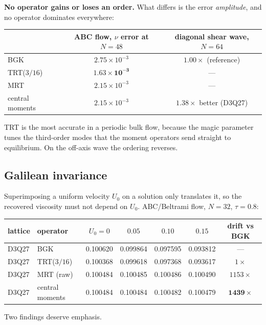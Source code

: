 \documentclass[11pt,a4paper]{article}
\begin{document}
\noindent \textbf{No operator gains or loses an order.} What differs is the error
\emph{amplitude}, and no operator dominates everywhere:

\begin{center}\small
\begin{tabular}{lcc}
\toprule
 & ABC flow, $\nu$ error at $N=48$ & diagonal shear wave, $N=64$ \\
\midrule
BGK & $2.75\times10^{-3}$ & $1.00\times$ (reference) \\
TRT($3/16$) & $\bm{1.63\times10^{-3}}$ & --- \\
MRT & $2.15\times10^{-3}$ & --- \\
central moments & $2.15\times10^{-3}$ & $\bm{1.38\times}$ better (D3Q27) \\
\bottomrule
\end{tabular}
\end{center}

\noindent TRT is the most accurate in a periodic bulk flow, because the magic
parameter tunes the third-order modes that the moment operators send straight to
equilibrium. On the off-axis wave the ordering reverses.

\subsection{Galilean invariance}
\label{sec:galilean}

Superimposing a uniform velocity $U_0$ on a solution only translates it, so the
recovered viscosity must not depend on $U_0$. ABC/Beltrami flow, $N=32$,
$\tau=0.8$:

\begin{center}\small
\begin{tabular}{llccccc}
\toprule
lattice & operator & $U_0{=}0$ & $0.05$ & $0.10$ & $0.15$ & drift vs BGK \\
\midrule
D3Q27 & BGK             & 0.100620 & 0.099864 & 0.097595 & 0.093812 & --- \\
D3Q27 & TRT($3/16$)     & 0.100368 & 0.099618 & 0.097368 & 0.093617 & $1\times$ \\
D3Q27 & MRT (raw)       & 0.100484 & 0.100485 & 0.100486 & 0.100490 & $1153\times$ \\
D3Q27 & central moments & 0.100484 & 0.100484 & 0.100482 & 0.100479 & $\bm{1439\times}$ \\
\bottomrule
\end{tabular}
\end{center}

Two findings deserve emphasis.
\end{document}
